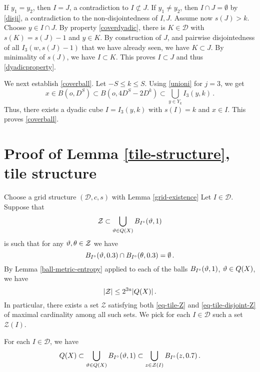 {If $y_1=y_2$, then $I=J$, a contradiction to $I\not \subset J$.
If $y_1\neq y_2$, then $I\cap J=\emptyset$ by \eqref{disji}, a contradiction to the non-disjointedness of $I,J$.%
Assume now $s(J)>k$. Choose $y\in I\cap J$. By property \eqref{coverdyadic},
there is $K\in \mathcal{D}$ with $s(K)=s(J)-1$ and $y\in K$. By construction
of $J$, and pairwise disjointedness of all $I_3(w,s(J)-1)$ that we have already seen,
we have $K\subset J$. By minimality of $s(J)$, we have $I\subset K$.
This proves $I\subset J$ and thus \eqref{dyadicproperty}.

We next establish \eqref{coverball}. Let $-S\leq k\leq S$. Using \eqref{unioni} for $j=3$, we get \begin{equation}
x\in B(o, D^S)\subset B(o, 4D^S-2D^k)\subset \bigcup_{y\in Y_k} I_3(y,k)\, .
\end{equation} Thus, there exists a dyadic cube $I=I_3(y, k)$ with $s(I)=k$ and $x\in I$. This proves \eqref{coverball}.


\section{Proof of Lemma \ref{tile-structure}, tile structure}
\label{subsectiles}
Choose a grid structure $(\mathcal{D}, c, s)$ with Lemma \ref{grid-existence}
Let $I \in \mathcal{D}$. Suppose that
\begin{equation}
    \label{eq-tile-Z}
    \mathcal{Z} \subset \bigcup_{{\vartheta} \in {Q}(X)} B_{I^\circ}({\vartheta}, 1)
\end{equation}
is such that for any ${\vartheta}, {\theta} \in \mathcal{Z}$ we have
\begin{equation}
    \label{eq-tile-disjoint-Z}
    B_{I^\circ}({\vartheta}, 0.3) \cap B_{I^\circ}({\theta}, 0.3) = \emptyset\,.
\end{equation}
By Lemma \ref{ball-metric-entropy} applied to each of the balls $B_{I^\circ}({\vartheta}, 1)$, ${\vartheta} \in {Q}(X)$, we have
$$
    |\mathcal{Z}| \le 2^{2a} |{Q}(X)|\,.
$$
In particular, there exists a set $\mathcal{Z}$ satisfying both \eqref{eq-tile-Z} and \eqref{eq-tile-disjoint-Z} of maximal cardinality among all such sets. We pick for each $I \in \mathcal{D}$ such a set $\mathcal{Z}(I)$.

\begin{lemma}
\label{frequency-ball-cover}
    For each $I \in \mathcal{D}$, we have
    \begin{equation}
        \label{eq-tile-cover}
        {Q}(X) \subset  \bigcup_{{\vartheta} \in {Q}(X)} B_{I^\circ}({\vartheta}, 1) \subset \bigcup_{z \in \mathcal{Z}(I)} B_{I^\circ}(z, 0.7)\,.
    \end{equation}
\end{lemma}

}
